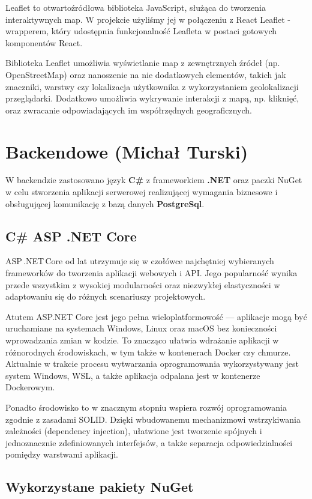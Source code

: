 Leaflet to otwartoźródłowa biblioteka JavaScript, służąca do tworzenia interaktywnych map. W projekcie użyliśmy jej w połączeniu z React Leaflet - wrapperem, który udostępnia funkcjonalność Leafleta w postaci gotowych komponentów React.

Biblioteka Leaflet umożliwia wyświetlanie map z zewnętrznych źródeł (np. OpenStreetMap) oraz nanoszenie na nie dodatkowych elementów, takich jak znaczniki, warstwy czy lokalizacja użytkownika z wykorzystaniem geolokalizacji przeglądarki. Dodatkowo umożliwia wykrywanie interakcji z mapą, np. kliknięć, oraz zwracanie odpowiadających im współrzędnych geograficznych.

\section{Backendowe (Michał Turski)}

W backendzie zastosowano język \textbf{C\#} z frameworkiem \textbf{.NET} oraz paczki NuGet w celu stworzenia aplikacji serwerowej realizującej wymagania biznesowe i obsługującej komunikację z bazą danych \textbf{PostgreSql}.


\subsection{C\# ASP .NET Core}

ASP .NET Core od lat utrzymuje się w czołówce najchętniej wybieranych frameworków do tworzenia aplikacji webowych i API. Jego popularność wynika przede wszystkim z wysokiej modularności oraz niezwykłej elastyczności w adaptowaniu się do różnych scenariuszy projektowych.

Atutem ASP.NET Core jest jego pełna wieloplatformowość — aplikacje mogą być uruchamiane na systemach Windows, Linux oraz macOS bez konieczności wprowadzania zmian w kodzie. To znacząco ułatwia wdrażanie aplikacji w różnorodnych środowiskach, w tym także w kontenerach Docker czy chmurze. Aktualnie w trakcie procesu wytwarzania oprogramowania wykorzystywany jest system Windows, WSL, a także aplikacja odpalana jest w kontenerze Dockerowym.  

Ponadto środowisko to w znacznym stopniu wspiera rozwój oprogramowania zgodnie z zasadami SOLID. Dzięki wbudowanemu mechanizmowi wstrzykiwania zależności (dependency injection), ułatwione jest tworzenie spójnych i jednoznacznie zdefiniowanych interfejsów, a także separacja odpowiedzialności pomiędzy warstwami aplikacji. 


\subsection{Wykorzystane pakiety NuGet}


